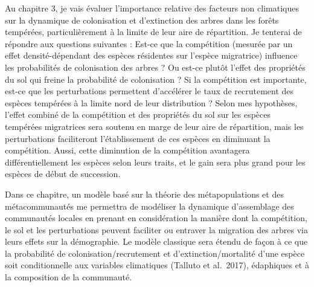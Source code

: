 Au chapitre 3, je vais évaluer l'importance relative des facteurs non
climatiques sur la dynamique de colonisation et d'extinction des arbres
dans les forêts tempérées, particulièrement à la limite de leur aire de
répartition. Je tenterai de répondre aux questions suivantes : Est-ce
que la compétition (mesurée par un effet densité-dépendant des espèces
résidentes sur l'espèce migratrice) influence les probabilités de
colonisation des arbres ? Ou est-ce plutôt l'effet des propriétés du sol
qui freine la probabilité de colonisation ? Si la compétition est
importante, est-ce que les perturbations permettent d'accélérer le taux
de recrutement des espèces tempérées à la limite nord de leur
distribution ? Selon mes hypothèses, l'effet combiné de la compétition
et des propriétés du sol sur les espèces tempérées migratrices sera
soutenu en marge de leur aire de répartition, mais les perturbations
faciliteront l'établissement de ces espèces en diminuant la compétition.
Aussi, cette diminution de la compétition avantagera différentiellement
les espèces selon leurs traits, et le gain sera plus grand pour les
espèces de début de succession.

Dans ce chapitre, un modèle basé sur la théorie des métapopulations et
des métacommunautés me permettra de modéliser la dynamique d'assemblage
des communautés locales en prenant en considération la manière dont la
compétition, le sol et les perturbations peuvent faciliter ou entraver
la migration des arbres via leurs effets sur la démographie. Le modèle
classique sera étendu de façon à ce que la probabilité de
colonisation/recrutement et d'extinction/mortalité d'une espèce soit
conditionnelle aux variables climatiques (Talluto et al.~2017),
édaphiques et à la composition de la communauté.



